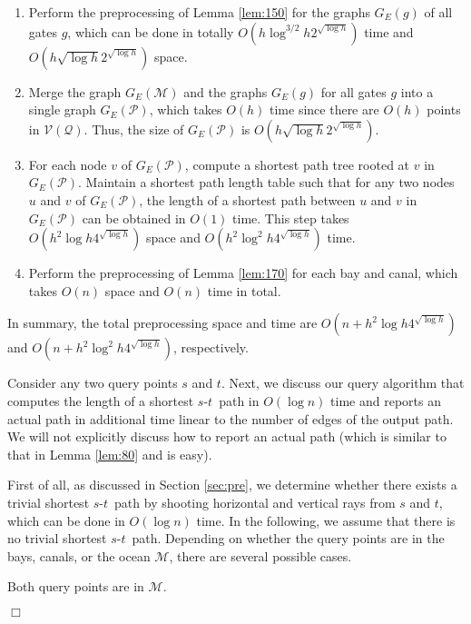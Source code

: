 \documentclass[english,runningheads,11pt]{llncs}
\def\calP{\mathcal{P}}
\def\calM{\mathcal{M}}
\def\calQ{\mathcal{Q}}
\def\calV{\mathcal{V}}
\def\st{$s$-$t$}
\newenvironment{proof}{\noindent {\textbf{Proof:}}\rm}{\hfill $\Box$\rm}
\begin{document}
\begin{proof}
\begin{enumerate}
\item
Perform the preprocessing of Lemma \ref{lem:150} for the graphs $G_E(g)$ of
all gates $g$, which can be done in totally $O(h\log^{3/2} h 2^{\sqrt{\log h}})$ time and
$O(h \sqrt{\log h}2^{\sqrt{\log h}})$ space.

\item
Merge the graph $G_E(\calM)$ and the graphs $G_E(g)$ for all gates
$g$ into a single graph $G_E(\calP)$, which takes $O(h)$ time since there are $O(h)$ points in
$\calV(\calQ)$.
Thus, the size of $G_E(\calP)$ is $O(h\sqrt{\log h} 2^{\sqrt{\log h}})$.

\item
For each node $v$ of $G_E(\calP)$, compute a shortest path tree rooted at $v$ in
$G_E(\calP)$. Maintain a shortest path length
table such that for any two nodes $u$ and
$v$ of $G_E(\calP)$, the length of a shortest path between $u$ and
$v$ in $G_E(\calP)$ can be obtained in $O(1)$ time. This step takes
$O(h^2\log h4^{\sqrt{\log h}})$ space and $O(h^2\log^{2}h4^{\sqrt{\log h}})$ time.

\item
Perform the preprocessing of Lemma \ref{lem:170} for each bay and canal,
which takes $O(n)$ space and $O(n)$ time in total.
\end{enumerate}

In summary, the total preprocessing space and time are
$O(n+h^2\log h4^{\sqrt{\log
h}})$ and $O(n+h^2\log^{2}h4^{\sqrt{\log h}})$, respectively.

Consider any two query points $s$ and $t$.
Next, we discuss our query algorithm that computes the
length of a shortest \st\ path in $O(\log n)$ time and reports an
actual path in additional time linear to the number of edges of the output
path. We will not explicitly discuss how to report an
actual path (which is similar to that in Lemma \ref{lem:80} and is easy).

First of all, as discussed in Section \ref{sec:pre},
we determine whether there exists a trivial shortest
\st\ path by shooting horizontal and vertical rays from $s$ and $t$,
which can be done in $O(\log n)$ time. In the following, we assume
that there is no trivial shortest \st\ path.
Depending on whether the query points are in the bays, canals, or the
ocean $\calM$, there are several possible cases.

\begin{description}
\item[Both query points are in $\calM$.]


\end{description}
\end{proof}
\end{document}
